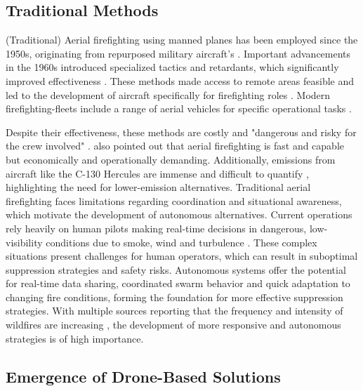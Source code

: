 \documentclass[twoside]{article}
\begin{document}
\subsection{Traditional Methods}

(Traditional) Aerial firefighting using manned planes has been employed since the 1950s, originating from repurposed military aircraft's \citep{janney2012airtankers}. Important advancements in the 1960s introduced specialized tactics and retardants, which significantly improved effectiveness \citep{struminskaFlightPerformanceAnalysis2024}.
These methods made access to remote areas feasible and led to the development of aircraft specifically for firefighting roles \citep{struminskaFlightPerformanceAnalysis2024,LockheedSuperHercules}. Modern firefighting-fleets include a range of aerial vehicles for specific operational tasks \citep{FleetInformationFirefighting}. 

Despite their effectiveness, these methods are costly and "dangerous and risky for the crew involved" \citep[p. 1896]{struminskaFlightPerformanceAnalysis2024}. \citet{struminskaFlightPerformanceAnalysis2024} also pointed out that aerial firefighting is fast and capable but economically and operationally demanding. Additionally, emissions from aircraft like the C-130 Hercules are immense and difficult to quantify \citep{LockheedC130Hercules2022,spicerRapidMeasurementEmissions2009}, highlighting the need for lower-emission alternatives.
Traditional aerial firefighting faces limitations regarding coordination and situational awareness, which motivate the development of autonomous alternatives. Current operations rely heavily on human pilots making real-time decisions in dangerous, low-visibility conditions due to smoke, wind and turbulence \citep{struminskaFlightPerformanceAnalysis2024}. These complex situations present challenges for human operators, which can result in suboptimal suppression strategies and safety risks. Autonomous systems offer the potential for real-time data sharing, coordinated swarm behavior and quick adaptation to changing fire conditions, forming the foundation for more effective suppression strategies. With multiple sources reporting that the frequency and intensity of wildfires are increasing \citep{copernicus-wildfires,IPCC2023,grassland_Wildfires}, the development of more responsive and autonomous strategies is of high importance.

\subsection{Emergence of Drone-Based Solutions}
\end{document}

